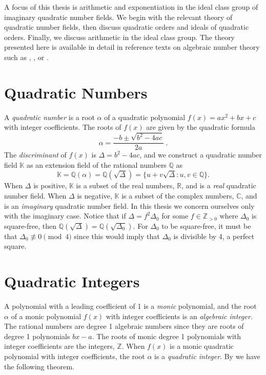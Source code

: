 \documentclass{ucalgthes1}
\theoremstyle{definition}
\newcommand{\CC}{\mathbb{C}}
\newcommand{\RR}{\mathbb{R}}
\newcommand{\KK}{\mathbb{K}}
\newcommand{\ZZ}{\mathbb{Z}}
\newcommand{\QQ}{\mathbb{Q}}
\newcommand{\ZZgtz}{\mathbb{Z}_{>0}}
\begin{document}
A focus of this thesis is arithmetic and exponentiation in the ideal class group of imaginary quadratic number fields.  We begin with the relevant theory of quadratic number fields, then discuss quadratic orders and ideals of quadratic orders.  Finally, we discuss arithmetic in the ideal class group.  The theory presented here is available in detail in reference texts on algebraic number theory such as \cite{Cohn1980}, \cite{Hua2012}, or \cite{Ireland1990}. 



\section{Quadratic Numbers}

A \emph{quadratic number} is a root $\alpha$ of a quadratic polynomial $f(x) = ax^2 + bx + c$ with integer coefficients. The roots of $f(x)$ are given by the quadratic formula
\[
	\alpha = \frac{-b \pm \sqrt{b^2 - 4ac}}{2a} ~.
\]
The \emph{discriminant} of $f(x)$ is $\Delta = b^2 - 4ac$, and we construct a quadratic number field $\KK$ as an extension field of the rational numbers $\QQ$ as
\[
	\KK = \QQ(\alpha) = \QQ(\sqrt{\Delta}) = \{u + v\sqrt{\Delta} : u,v \in \QQ\}.
\]
When $\Delta$ is positive, $\KK$ is a subset of the real numbers, $\RR$, and is a \emph{real} quadratic number field. When $\Delta$ is negative, $\KK$ is a subset of the complex numbers, $\CC$, and is an \emph{imaginary} quadratic number field.  In this thesis we concern ourselves only with the imaginary case.  Notice that if $\Delta = f^2 \Delta_0$ for some $f \in \ZZgtz$ where $\Delta_0$ is square-free, then $\QQ(\sqrt{\Delta}) = \QQ(\sqrt{\Delta_0})$. For $\Delta_0$ to be square-free, it must be that $\Delta_0 \not\equiv 0 \pmod 4$ since this would imply that $\Delta_0$ is divisible by 4, a perfect square.  


\bigbreak
\section{Quadratic Integers}

A polynomial with a leading coefficient of 1 is a \emph{monic} polynomial, and the root $\alpha$ of a monic polynomial $f(x)$ with integer coefficients is an \emph{algebraic integer}. The rational numbers are degree 1 algebraic numbers since they are roots of degree 1 polynomials $bx-a$.  The roots of monic degree 1 polynomials with integer coefficients are the integers, $\ZZ$.  When $f(x)$ is a monic quadratic polynomial with integer coefficients, the root $\alpha$ is a \emph{quadratic integer}. By \cite[p.77]{Jacobson2009} we have the following theorem.
\end{document}

